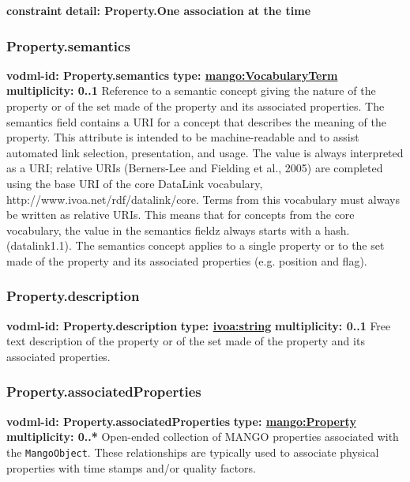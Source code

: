     \noindent \textbf{constraint} \newline
    \indent    \textbf{detail: Property.One association at the time
 }\newline


    \subsubsection{Property.semantics}
      \textbf{vodml-id: Property.semantics} \newline
      \textbf{type: \hyperref[sect:VocabularyTerm]{mango:VocabularyTerm}} \newline
      \textbf{multiplicity: 0..1} \newline
      Reference to a semantic concept giving the nature of the property or of the set made of the property and its associated properties. The semantics field contains a URI for a concept that describes the meaning of the property. This attribute is intended to be machine-readable and to assist automated link selection, presentation, and usage. The value is always interpreted as a URI; relative URIs (Berners-Lee and Fielding et al., 2005) are completed using the base URI of the core DataLink vocabulary, http://www.ivoa.net/rdf/datalink/core. Terms from this vocabulary must always be written as relative URIs. This means that for concepts from the core vocabulary, the value in the semantics fieldz always starts with a hash. (datalink1.1). The semantics concept applies to a single property or to the set made of the property and its associated properties (e.g. position and flag).

    \subsubsection{Property.description}
      \textbf{vodml-id: Property.description} \newline
      \textbf{type: \hyperref[sect:ivoa]{ivoa:string}} \newline
      \textbf{multiplicity: 0..1} \newline
      Free text description of the property or of the set made of the property and its associated properties.

    \subsubsection{Property.associatedProperties}
      \textbf{vodml-id: Property.associatedProperties} \newline
      \textbf{type: \hyperref[sect:Property]{mango:Property}} \newline
      \textbf{multiplicity: 0..*} \newline
      Open-ended collection of MANGO properties associated with the \texttt{MangoObject}. These relationships are typically used to associate physical properties with time stamps and/or quality factors.

